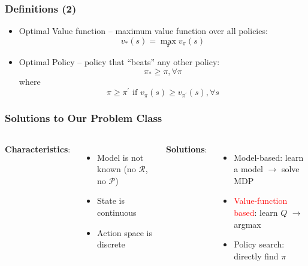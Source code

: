 \documentclass{beamer}
\begin{document}
\begin{frame}
\frametitle{Definitions (2)}

\begin{itemize}
	
	\item Optimal Value function -- maximum value
	function over all policies:	
$$
v_{*}(s)=\max _{\pi} v_{\pi}(s)
$$


\item Optimal Policy -- policy that ``beats''
any other policy:
$$
\pi_{*} \geq \pi, \forall \pi
$$
where
$$
\pi \geq \pi^{\prime} \text { if } v_{\pi}(s) \geq v_{\pi^{\prime}}(s), \forall s
$$

\end{itemize}

\end{frame}



\begin{frame}
\frametitle{Solutions to Our Problem Class}
\begin{columns}[c] %
	
	\textbf{Characteristics}:
	\begin{itemize}
		\item Model is not known (no $\mathcal{R}$, no $\mathcal{P}$)
		\item State is continuous  
		\item Action space is discrete 
	
	\end{itemize} 
	
		\textbf{Solutions}:
	\begin{itemize}
	\item Model-based: learn a model $\rightarrow$ solve MDP
	\item \textcolor{red}{Value-function based}: learn $Q$ $\rightarrow$ argmax
	\item Policy search: directly find $\pi$

	\end{itemize}
	
\end{columns}

\end{frame}
\end{document}

